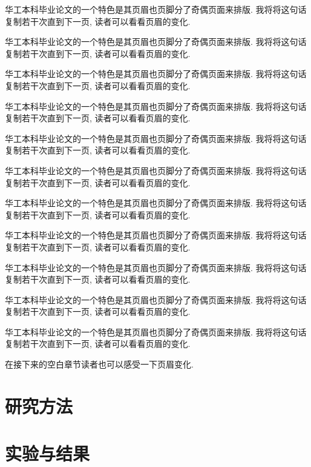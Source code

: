 \documentclass[a4paper]{article}
\begin{document}
华工本科毕业论文的一个特色是其页眉也页脚分了奇偶页面来排版. 我将将这句话复制若干次直到下一页, 读者可以看看页眉的变化.

华工本科毕业论文的一个特色是其页眉也页脚分了奇偶页面来排版. 我将将这句话复制若干次直到下一页, 读者可以看看页眉的变化.

华工本科毕业论文的一个特色是其页眉也页脚分了奇偶页面来排版. 我将将这句话复制若干次直到下一页, 读者可以看看页眉的变化.

华工本科毕业论文的一个特色是其页眉也页脚分了奇偶页面来排版. 我将将这句话复制若干次直到下一页, 读者可以看看页眉的变化.

华工本科毕业论文的一个特色是其页眉也页脚分了奇偶页面来排版. 我将将这句话复制若干次直到下一页, 读者可以看看页眉的变化.

华工本科毕业论文的一个特色是其页眉也页脚分了奇偶页面来排版. 我将将这句话复制若干次直到下一页, 读者可以看看页眉的变化.

华工本科毕业论文的一个特色是其页眉也页脚分了奇偶页面来排版. 我将将这句话复制若干次直到下一页, 读者可以看看页眉的变化.

华工本科毕业论文的一个特色是其页眉也页脚分了奇偶页面来排版. 我将将这句话复制若干次直到下一页, 读者可以看看页眉的变化.

华工本科毕业论文的一个特色是其页眉也页脚分了奇偶页面来排版. 我将将这句话复制若干次直到下一页, 读者可以看看页眉的变化.

华工本科毕业论文的一个特色是其页眉也页脚分了奇偶页面来排版. 我将将这句话复制若干次直到下一页, 读者可以看看页眉的变化.

华工本科毕业论文的一个特色是其页眉也页脚分了奇偶页面来排版. 我将将这句话复制若干次直到下一页, 读者可以看看页眉的变化.

在接下来的空白章节读者也可以感受一下页眉变化.

\pagebreak[4]

\section{研究方法}

\pagebreak[4]

\section{实验与结果}
\end{document}

